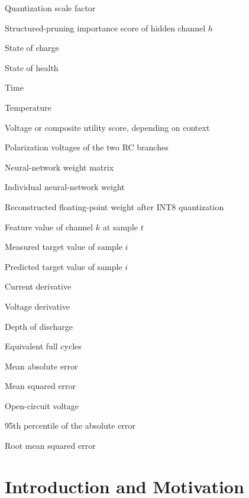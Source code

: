 \documentclass[
    a4paper,
    12pt,
    titlepage,
    bibliography=totoc,
    twoside=on,
    parskip=false,
    numbers=noenddot,
    cleardoublepage=empty,
    DIV=12,
    BCOR=12.0mm,
    headheight=36pt,
    headings=openright
]{scrreprt}
\newcommand{\chapterrole}[1]{}
\begin{document}
\begin{description}[style=nextline,leftmargin=3.2cm]
\item[$s$] Quantization scale factor
\item[$s_h$] Structured-pruning importance score of hidden channel $h$
\item[$SOC$] State of charge
\item[$SOH$] State of health
\item[$t$] Time
\item[$T$] Temperature
\item[$U$] Voltage or composite utility score, depending on context
\item[$U_1,U_2$] Polarization voltages of the two RC branches
\item[$W$] Neural-network weight matrix
\item[$w$] Individual neural-network weight
\item[$\hat{w}$] Reconstructed floating-point weight after INT8 quantization
\item[$x_{t,k}$] Feature value of channel $k$ at sample $t$
\item[$y_i$] Measured target value of sample $i$
\item[$\hat{y}_i$] Predicted target value of sample $i$
\item[$\mathrm{d}I/\mathrm{d}t$] Current derivative
\item[$\mathrm{d}U/\mathrm{d}t$] Voltage derivative
\item[$\mathrm{DoD}$] Depth of discharge
\item[$\mathrm{EFC}$] Equivalent full cycles
\item[$\mathrm{MAE}$] Mean absolute error
\item[$\mathrm{MSE}$] Mean squared error
\item[$\mathrm{OCV}$] Open-circuit voltage
\item[$\mathrm{P95}$] 95th percentile of the absolute error
\item[$\mathrm{RMSE}$] Root mean squared error
\end{description}

\listoffigures
{}
\listoftables
{}

\cleardoublepage
{}

\chapter{Introduction and Motivation}
\chapterrole{}
\end{document}
